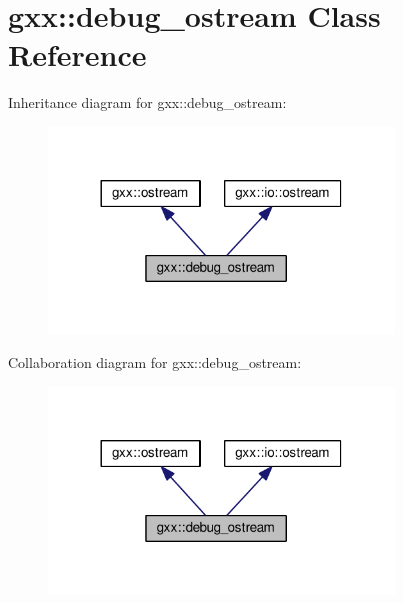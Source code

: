 \hypertarget{classgxx_1_1debug__ostream}{}\section{gxx\+:\+:debug\+\_\+ostream Class Reference}
\label{classgxx_1_1debug__ostream}


Inheritance diagram for gxx\+:\+:debug\+\_\+ostream\+:
\nopagebreak
\begin{figure}[H]
\begin{center}
\leavevmode
\includegraphics[width=260pt]{classgxx_1_1debug__ostream__inherit__graph}
\end{center}
\end{figure}


Collaboration diagram for gxx\+:\+:debug\+\_\+ostream\+:
\nopagebreak
\begin{figure}[H]
\begin{center}
\leavevmode
\includegraphics[width=260pt]{classgxx_1_1debug__ostream__coll__graph}
\end{center}
\end{figure}
